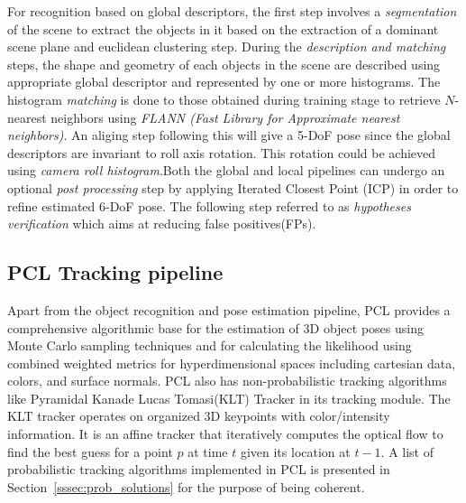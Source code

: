	For recognition based on global descriptors, the first step involves a \emph{segmentation} of the scene to extract the objects in it based on the extraction of a dominant scene plane and euclidean clustering step. During the \emph{description and matching} steps, the shape and geometry of each objects in the scene are described using appropriate global descriptor and represented by one or more histograms. The histogram \emph{matching} is done to those obtained during training stage to retrieve $N$-nearest neighbors using \emph{FLANN (Fast Library for Approximate nearest neighbors)}. An aliging step following this will give a 5-DoF pose since the global descriptors are invariant to roll axis rotation. This rotation could be achieved using \emph{camera roll histogram}.Both the global and local pipelines can undergo an optional \emph{post processing} step by applying Iterated Closest Point (ICP) in order to refine estimated 6-DoF pose. The following step referred to as \emph{hypotheses verification} which aims at reducing false positives(FPs).
\subsection{PCL Tracking pipeline}
	Apart from the object recognition and pose estimation pipeline, PCL\cite{RUeda2012} provides a comprehensive algorithmic base for the estimation of 3D object poses using Monte Carlo sampling techniques and for calculating the likelihood using combined weighted metrics for hyperdimensional spaces including cartesian data, colors, and surface normals. PCL also has non-probabilistic tracking algorithms like Pyramidal Kanade Lucas Tomasi(KLT) Tracker in its tracking module. The KLT tracker operates on organized 3D keypoints with color/intensity information. It is an affine tracker that iteratively computes the optical flow to find the best guess for a point $p$ at time $t$ given its location at $t-1$. A list of probabilistic tracking algorithms implemented in PCL is presented in Section~\ref{sssec:prob_solutions} for the purpose of being coherent.
